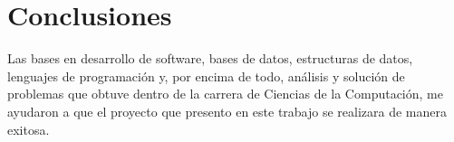 \chapter{Conclusiones}
\label{cap:conclusiones}

Las bases en desarrollo de software, bases de datos, estructuras de datos,
lenguajes de programación y, por encima de todo, análisis y solución de
problemas que obtuve dentro de la carrera de Ciencias de la Computación, me
ayudaron a que el proyecto que presento en este trabajo se realizara de manera
exitosa.

\cleardoublepage

